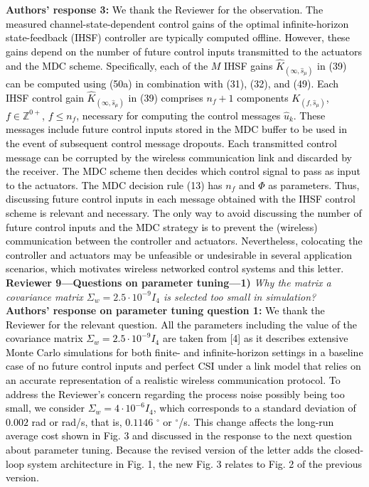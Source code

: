 \textbf{Authors' response 3:} \textcolor{black}{
We thank the Reviewer for the observation. The measured channel-state-dependent control gains of the optimal infinite-horizon state-feedback (IHSF) controller are typically computed offline. However, these gains depend on the number of future control inputs transmitted to the actuators and the MDC scheme. Specifically, each of the $M$ IHSF gains $\hat{K}_{(\infty,\hat{s}_{\mu})}$ in (39) can be computed using (50a) in combination with (31), (32), and (49). Each IHSF control gain $\hat{K}_{(\infty,\hat{s}_{\mu})}$ in (39) comprises $n_f+1$ components $K_{(f,\hat{s}_{\mu})}$,  $f\in\mathbb{Z}^{0+}$, $f\leq n_f$, necessary for computing the control messages $\hat{u}_k$. These messages include future control inputs stored in the MDC buffer to be used in the event of subsequent control message dropouts. Each transmitted control message can be corrupted by the wireless communication link and discarded by the receiver. The MDC scheme then decides which control signal to pass as input to the actuators. The MDC decision rule (13) has $n_f$ and $\mathit{\Phi}$ as parameters. Thus, discussing future control inputs in each message obtained with the IHSF control scheme is relevant and necessary. The only way to avoid discussing the number of future control inputs and the MDC strategy is to prevent the (wireless) communication between the controller and actuators. Nevertheless, colocating the controller and actuators may be unfeasible or undesirable in several application scenarios, which motivates wireless networked control systems and this letter.}\\[4mm]
\textbf{Reviewer 9—Questions on parameter tuning—1)}\textit{ %
Why the matrix a covariance matrix $\Sigma_{w}=2.5\cdot 10^{-9} I_4$ is selected too small in simulation?}\\[2mm]
\textbf{Authors' response on parameter tuning question 1:} \textcolor{black}{We thank the Reviewer for the relevant question. All the parameters including the value of the covariance matrix $\Sigma_{w}=2.5\cdot 10^{-9} I_4$ are taken from [4] as it describes extensive Monte Carlo simulations for both finite- and infinite-horizon settings in a baseline case of no future control inputs and perfect CSI under a
link model that relies on an accurate representation of a realistic wireless communication protocol. To address the Reviewer's concern regarding the process noise possibly being too small, we consider $\Sigma_{w}=4\cdot 10^{-6} I_4$, which corresponds to a standard deviation of $0.002$ rad or rad/s, that is, $0.1146$ $^{\circ}$ or $^{\circ}\!$/s. This change affects the long-run average cost shown in Fig. 3 and discussed in the response to the next question about parameter tuning. Because the revised version of the letter adds the closed-loop system architecture in Fig. 1, the new Fig. 3 relates to Fig. 2 of the previous version.}\\[4mm]
